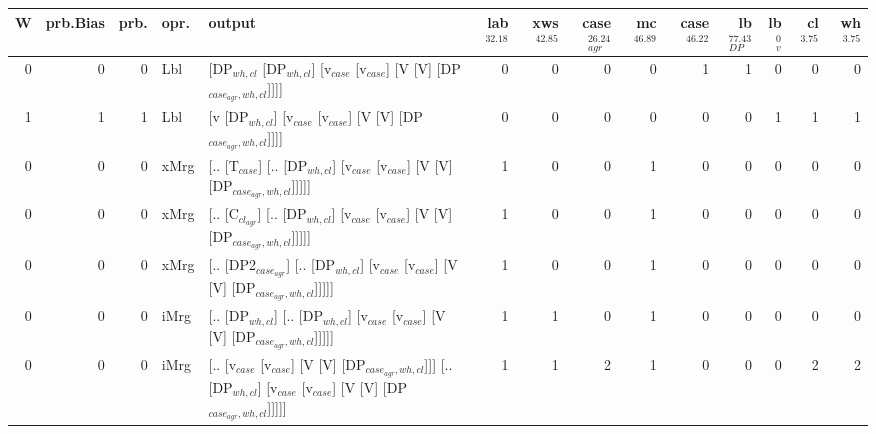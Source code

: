 \begin{tabularx}{\linewidth}{rrrlXrrrrrrrrr}
\hline
   W &   prb.Bias &   prb. & opr.   & output                                                                                                           &   lab$^{32.18}$ &   xws$^{42.85}$ &   case$_{agr}^{26.24}$ &   mc$^{46.89}$ &   case$^{46.22}$ &   lb$_{DP}^{77.43}$ &   lb$_{v}^{0}$ &   cl$^{3.75}$ &   wh$^{3.75}$ \\
\hline
   0 &       0 &   0 & Lbl  & [DP$_{wh,cl}$ [DP$_{wh,cl}$] [v$_{case}$ [v$_{case}$] [V [V] [DP$_{case_{agr},wh,cl}$]]]]                                              &             0 &             0 &                  0 &            0 &              1 &               1 &             0 &        0 &        0 \\
   1 &       1 &   1 & Lbl  & [v [DP$_{wh,cl}$] [v$_{case}$ [v$_{case}$] [V [V] [DP$_{case_{agr},wh,cl}$]]]]                                                     &             0 &             0 &                  0 &            0 &              0 &               0 &             1 &        1 &        1 \\
   0 &       0 &   0 & xMrg & [.. [T$_{case}$] [.. [DP$_{wh,cl}$] [v$_{case}$ [v$_{case}$] [V [V] [DP$_{case_{agr},wh,cl}$]]]]]                                      &             1 &             0 &                  0 &            1 &              0 &               0 &             0 &        0 &        0 \\
   0 &       0 &   0 & xMrg & [.. [C$_{cl_{agr}}$] [.. [DP$_{wh,cl}$] [v$_{case}$ [v$_{case}$] [V [V] [DP$_{case_{agr},wh,cl}$]]]]]                                    &             1 &             0 &                  0 &            1 &              0 &               0 &             0 &        0 &        0 \\
   0 &       0 &   0 & xMrg & [.. [DP2$_{case_{agr}}$] [.. [DP$_{wh,cl}$] [v$_{case}$ [v$_{case}$] [V [V] [DP$_{case_{agr},wh,cl}$]]]]]                                &             1 &             0 &                  0 &            1 &              0 &               0 &             0 &        0 &        0 \\
   0 &       0 &   0 & iMrg & [.. [DP$_{wh,cl}$] [.. [DP$_{wh,cl}$] [v$_{case}$ [v$_{case}$] [V [V] [DP$_{case_{agr},wh,cl}$]]]]]                                    &             1 &             1 &                  0 &            1 &              0 &               0 &             0 &        0 &        0 \\
   0 &       0 &   0 & iMrg & [.. [v$_{case}$ [v$_{case}$] [V [V] [DP$_{case_{agr},wh,cl}$]]] [.. [DP$_{wh,cl}$] [v$_{case}$ [v$_{case}$] [V [V] [DP$_{case_{agr},wh,cl}$]]]]] &             1 &             1 &                  2 &            1 &              0 &               0 &             0 &        2 &        2 \\

\end{tabularx}
